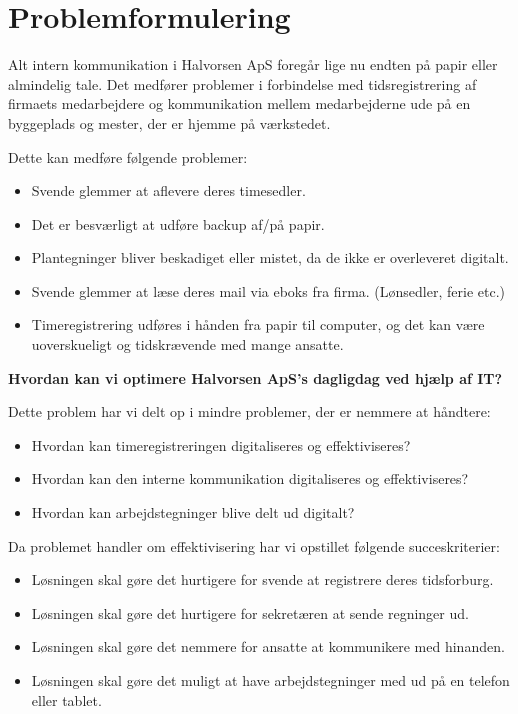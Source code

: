 \section{Problemformulering} \label{problemformulering}

Alt intern kommunikation i Halvorsen ApS foregår lige nu endten på papir eller almindelig tale. Det medfører problemer i forbindelse med tidsregistrering af firmaets medarbejdere og kommunikation mellem medarbejderne ude på en byggeplads og mester, der er hjemme på værkstedet.

Dette kan medføre følgende problemer:
\begin{itemize}
    \item Svende glemmer at aflevere deres timesedler.
    \item Det er besværligt at udføre backup af/på papir.
    \item Plantegninger bliver beskadiget eller mistet, da de ikke er overleveret digitalt.
    \item Svende glemmer at læse deres mail via eboks fra firma. (Lønsedler, ferie etc.)
    \item Timeregistrering udføres i hånden fra papir til computer, og det kan være uoverskueligt og tidskrævende med mange ansatte.
\end{itemize}

\textbf{Hvordan kan vi optimere Halvorsen ApS's dagligdag ved hjælp af IT?}

Dette problem har vi delt op i mindre problemer, der er nemmere at håndtere:
\begin{itemize}
    \item Hvordan kan timeregistreringen digitaliseres og effektiviseres?
    \item Hvordan kan den interne kommunikation digitaliseres og effektiviseres?
    \item Hvordan kan arbejdstegninger blive delt ud digitalt?
\end{itemize}

Da problemet handler om effektivisering har vi opstillet følgende succeskriterier:

\begin{itemize}
    \item Løsningen skal gøre det hurtigere for svende at registrere deres tidsforburg.
    \item Løsningen skal gøre det hurtigere for sekretæren at sende regninger ud.
    \item Løsningen skal gøre det nemmere for ansatte at kommunikere med hinanden.
    \item Løsningen skal gøre det muligt at have arbejdstegninger med ud på en telefon eller tablet.
\end{itemize}